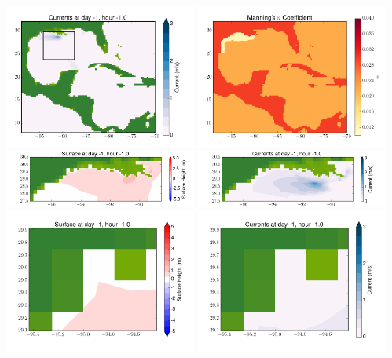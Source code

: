 \documentclass[11pt]{article}
\begin{document}
\includegraphics[width=0.475\textwidth]{frame0047fig2.png}
\vskip 10pt 
\includegraphics[width=0.475\textwidth]{frame0047fig3.png}
\includegraphics[width=0.475\textwidth]{frame0047fig4.png}
\vskip 10pt 
\includegraphics[width=0.475\textwidth]{frame0047fig5.png}
\includegraphics[width=0.475\textwidth]{frame0047fig6.png}
\vskip 10pt 
\includegraphics[width=0.475\textwidth]{frame0047fig7.png}
\end{document}
